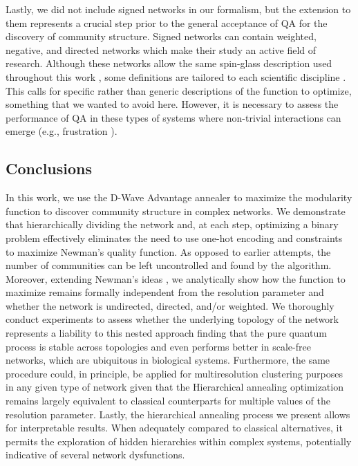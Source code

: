 \documentclass[pdflatex,sn-mathphys-num]{sn-jnl}%
\begin{document}
Lastly, we did not include signed networks in our formalism, but the extension to them represents a crucial step prior to the general acceptance of QA for the discovery of community structure. Signed networks can contain weighted, negative, and directed networks which make their study an active field of research. Although these networks allow the same spin-glass description used throughout this work \cite{Traag2009}, some definitions are tailored to each scientific discipline \cite{Kaplan2008,Gomez2009,rubinov2011weight}. This calls for specific rather than generic descriptions of the function to optimize, something that we wanted to avoid here. However, it is necessary to assess the performance of QA in these types of systems where non-trivial interactions can emerge (e.g., frustration \cite{kirkley2019balance}).

\subsection*{Conclusions}
In this work, we use the D-Wave Advantage annealer to maximize the modularity function to discover community structure in complex networks. We demonstrate that hierarchically dividing the network and, at each step, optimizing a binary problem effectively eliminates the need to use one-hot encoding and constraints to maximize Newman's quality function. As opposed to earlier attempts, the number of communities can be left uncontrolled and found by the algorithm. Moreover, extending Newman's ideas \citep{Newman2006,Leicht2008}, we analytically show how the function to maximize remains formally independent from the resolution parameter and whether the network is undirected, directed, and/or weighted. We thoroughly conduct experiments to assess whether the underlying topology of the network represents a liability to this nested approach finding that the pure quantum process is stable across topologies and even performs better in scale-free networks, which are ubiquitous in biological systems. Furthermore, the same procedure could, in principle, be applied for multiresolution clustering purposes in any given type of network given that the Hierarchical annealing optimization remains largely equivalent to classical counterparts for multiple values of the resolution parameter. Lastly, the hierarchical annealing process we present allows for interpretable results. When adequately compared to classical alternatives, it permits the exploration of hidden hierarchies within complex systems, potentially indicative of several network dysfunctions.  
\end{document}
